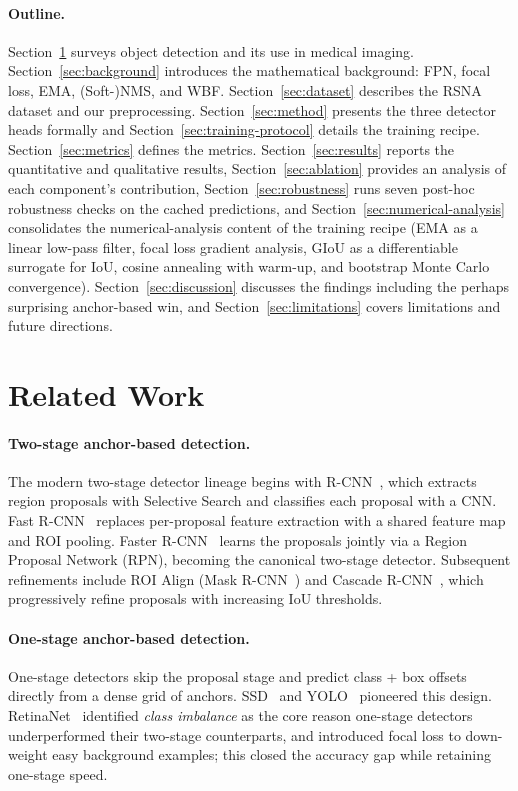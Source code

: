 \documentclass[11pt,a4paper]{article}
\begin{document}
\paragraph{Outline.} Section~\ref{sec:related} surveys object detection and its use in medical imaging. Section~\ref{sec:background} introduces the mathematical background: FPN, focal loss, EMA, (Soft-)NMS, and WBF. Section~\ref{sec:dataset} describes the RSNA dataset and our preprocessing. Section~\ref{sec:method} presents the three detector heads formally and Section~\ref{sec:training-protocol} details the training recipe. Section~\ref{sec:metrics} defines the metrics. Section~\ref{sec:results} reports the quantitative and qualitative results, Section~\ref{sec:ablation} provides an analysis of each component's contribution, Section~\ref{sec:robustness} runs seven post-hoc robustness checks on the cached predictions, and Section~\ref{sec:numerical-analysis} consolidates the numerical-analysis content of the training recipe (EMA as a linear low-pass filter, focal loss gradient analysis, GIoU as a differentiable surrogate for IoU, cosine annealing with warm-up, and bootstrap Monte Carlo convergence). Section~\ref{sec:discussion} discusses the findings including the perhaps surprising anchor-based win, and Section~\ref{sec:limitations} covers limitations and future directions.

\section{Related Work}
\label{sec:related}

\paragraph{Two-stage anchor-based detection.}
The modern two-stage detector lineage begins with R-CNN~\cite{girshick2014rcnn}, which extracts region proposals with Selective Search and classifies each proposal with a CNN. Fast R-CNN~\cite{girshick2015fast} replaces per-proposal feature extraction with a shared feature map and ROI pooling. Faster R-CNN~\cite{ren2015faster} learns the proposals jointly via a Region Proposal Network (RPN), becoming the canonical two-stage detector. Subsequent refinements include ROI Align (Mask R-CNN~\cite{he2017maskrcnn}) and Cascade R-CNN~\cite{cai2018cascade}, which progressively refine proposals with increasing IoU thresholds.

\paragraph{One-stage anchor-based detection.}
One-stage detectors skip the proposal stage and predict class + box offsets directly from a dense grid of anchors. SSD~\cite{liu2016ssd} and YOLO~\cite{redmon2016yolo} pioneered this design. RetinaNet~\cite{lin2017focal} identified \emph{class imbalance} as the core reason one-stage detectors underperformed their two-stage counterparts, and introduced focal loss to down-weight easy background examples; this closed the accuracy gap while retaining one-stage speed.
\end{document}
